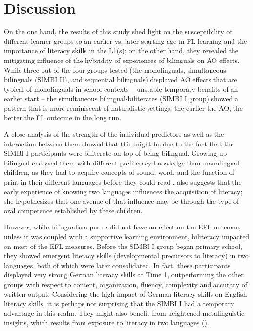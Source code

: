 \documentclass[output=paper,modfonts,nonflat,newtxmath]{langsci/langscibook}
\begin{document}
\clearpage
\section{Discussion}\largerpage

On the one hand, the results of this study shed light on the susceptibility of different learner groups to an earlier vs. later starting age in FL learning and the importance of literacy skills in the L1(s); on the other hand, they revealed the mitigating influence of the hybridity of experiences of bilinguals on AO effects. While three out of the four groups tested (the monolinguals, simultaneous bilinguals (SIMBI II), and sequential bilinguals) displayed AO effects that are typical of monolinguals in school contexts – unstable temporary benefits of an earlier start – the simultaneous bilingual-biliterates (SIMBI I group) showed a pattern that is more reminiscent of naturalistic settings: the earlier the AO, the better the FL outcome in the long run.

A close analysis of the strength of the individual predictors as well as the interaction between them showed that this might be due to the fact that the SIMBI I participants were biliterate on top of being bilingual. Growing up bilingual endowed them with different preliteracy knowledge than monolingual children, as they had to acquire concepts of sound, word, and the function of print in their different languages before they could read \citep{Bialystok2007}. \citet{Bialystok2007} also suggests that the early experience of knowing two languages influences the acquisition of literacy; she hypothesizes that one avenue of that influence may be through the type of oral competence established by these children.

However, while bilingualism per se did not have an effect on the EFL outcome, unless it was coupled with a supportive learning environment, biliteracy impacted on most of the EFL measures. Before the SIMBI I group began primary school, they showed emergent literacy skills (developmental precursors to literacy) in two languages, both of which were later consolidated. In fact, these participants displayed very strong German literacy skills at Time 1, outperforming the other groups with respect to content, organization, fluency, complexity and accuracy of written output. Considering the high impact of German literacy skills on English literacy skills, it is perhaps not surprising that the SIMBI I had a temporary advantage in this realm. They might also benefit from heightened metalinguistic insights, which results from exposure to literacy in two languages (\citealt{Sanz2000, Bialystok2007}).
\end{document}
